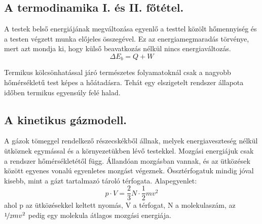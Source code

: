 \subsection{A termodinamika I. és II. főtétel.}
\begin{theorem}[I. főtétel]
	A testek belső energiájának megváltozása egyenlő a testtel közölt hőmennyiség és a testen végzett munka előjeles összegével. Ez az energiamegmaradás törvénye, mert azt mondja ki, hogy külső beavatkozás nélkül nincs energiaváltozás.
	$$ \Delta E_b = Q+W $$
\end{theorem}
\begin{theorem}[II. főtétel]
	Termikus kölcsönhatással járó természetes folyamatoknál csak a nagyobb hőmérsékletű test képes a hőátadásra. Tehát egy elszigetelt rendszer állapota időben termikus egyensúly felé halad.
\end{theorem}

\subsection{A kinetikus gázmodell.}
A gázok tömeggel rendelkező részecskékből állnak, melyek energiaveszteség nélkül ütköznek egymással és a környezetükben lévő testekkel. Mozgási energiájuk csak a rendszer hőmérsékletétől függ. Állandóan mozgásban vannak, és az ütközések között egyenes vonalú egyenletes mozgást végeznek. Össztérfogatuk mindig jóval kisebb, mint a gázt tartalmazó tároló térfogata.
Alapegyenlet: $$p \cdot V = \frac{2}{3}N \cdot \frac{1}{2}mv^2$$ ahol p az ütközésekkel keltett nyomás, V a térfogat, N a molekulaszám, az $\nicefrac{1}{2}mv^2$ pedig egy molekula átlagos mozgási energiája.